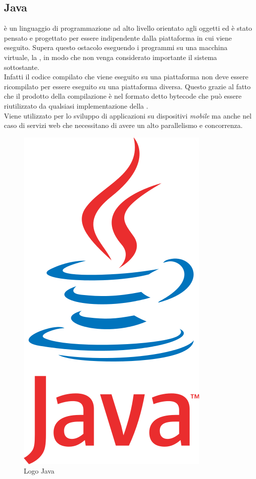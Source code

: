     \subsection{Java}
       è un linguaggio di programmazione ad alto livello orientato agli oggetti ed è stato pensato e progettato per essere indipendente dalla piattaforma in cui viene eseguito.
      Supera questo ostacolo eseguendo i programmi su una macchina virtuale, la , in modo che non venga considerato importante il sistema sottostante.\\
      Infatti il codice compilato che viene eseguito su una piattaforma non deve essere ricompilato per essere eseguito su una piattaforma diversa. Questo grazie al fatto che il prodotto della compilazione è nel formato detto bytecode che può essere riutilizzato da qualsiasi implementazione della .\\
      Viene utilizzato per lo sviluppo di applicazioni su dispositivi \textit{mobile} ma anche nel caso di servizi web che necessitano di avere un alto parallelismo e concorrenza.
      \begin{figure}[h]
        \centering
        \includegraphics[scale=0.12]{immagini/java.png}
        \caption{Logo Java}
        \label{java}
      \end{figure}
    \newpage
